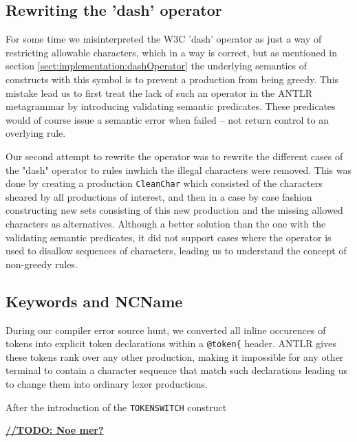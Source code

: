 \subsection{Rewriting the 'dash' operator}

For some time we misinterpreted the W3C 'dash' operator as just a way of restricting allowable characters, which in a way is correct, but as mentioned in section \ref{sect:implementation:dashOperator} the underlying semantics of constructs with this symbol is to prevent a production from being greedy. This mistake lead us to first treat the lack of such an operator in the ANTLR metagrammar by introducing validating semantic predicates. These predicates would of course issue a semantic error when failed -- not return control to an overlying rule.

Our second attempt to rewrite the operator was to rewrite the different cases of the "dash" operator to rules inwhich the illegal characters were removed. This was done by creating a production \verb!CleanChar! which consisted of the characters sheared by all productions of interest, and then in a case by case fashion constructing new sets consisting of this new production and the missing allowed characters as alternatives. Although a better solution than the one with the validating semantic predicates, it did not support cases where the operator is used to disallow sequences of characters, leading us to understand the concept of non-greedy rules.

\subsection{Keywords and NCName}
During our compiler error source hunt, we converted all inline occurences of tokens into explicit token declarations within a \verb!@token{! header. ANTLR gives these tokens rank over any other production, making it impossible for any other terminal to contain a character sequence that match such declarations leading us to change them into ordinary lexer productions.

After the introduction of the \verb!TOKENSWITCH! construct

\underline{\textbf{\LARGE //TODO: Noe mer?}}